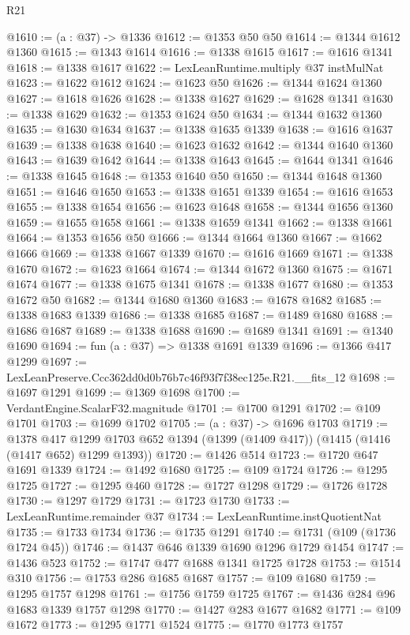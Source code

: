 \begin{lexlean}{R21}
\begin{coremodule}
@1610 := (a : @37) -> @1336
@1612 := @1353 @50 @50
@1614 := @1344 @1612 @1360
@1615 := @1343 @1614
@1616 := @1338 @1615
@1617 := @1616 @1341
@1618 := @1338 @1617
@1622 := LexLeanRuntime.multiply @37 instMulNat
@1623 := @1622 @1612
@1624 := @1623 @50
@1626 := @1344 @1624 @1360
@1627 := @1618 @1626
@1628 := @1338 @1627
@1629 := @1628 @1341
@1630 := @1338 @1629
@1632 := @1353 @1624 @50
@1634 := @1344 @1632 @1360
@1635 := @1630 @1634
@1637 := @1338 @1635 @1339
@1638 := @1616 @1637
@1639 := @1338 @1638
@1640 := @1623 @1632
@1642 := @1344 @1640 @1360
@1643 := @1639 @1642
@1644 := @1338 @1643
@1645 := @1644 @1341
@1646 := @1338 @1645
@1648 := @1353 @1640 @50
@1650 := @1344 @1648 @1360
@1651 := @1646 @1650
@1653 := @1338 @1651 @1339
@1654 := @1616 @1653
@1655 := @1338 @1654
@1656 := @1623 @1648
@1658 := @1344 @1656 @1360
@1659 := @1655 @1658
@1661 := @1338 @1659 @1341
@1662 := @1338 @1661
@1664 := @1353 @1656 @50
@1666 := @1344 @1664 @1360
@1667 := @1662 @1666
@1669 := @1338 @1667 @1339
@1670 := @1616 @1669
@1671 := @1338 @1670
@1672 := @1623 @1664
@1674 := @1344 @1672 @1360
@1675 := @1671 @1674
@1677 := @1338 @1675 @1341
@1678 := @1338 @1677
@1680 := @1353 @1672 @50
@1682 := @1344 @1680 @1360
@1683 := @1678 @1682
@1685 := @1338 @1683 @1339
@1686 := @1338 @1685
@1687 := @1489 @1680
@1688 := @1686 @1687
@1689 := @1338 @1688
@1690 := @1689 @1341
@1691 := @1340 @1690
@1694 := fun (a : @37) => @1338 @1691 @1339
@1696 := @1366 @417 @1299
@1697 := LexLeanPreserve.Ccc362dd0d0b76b7c46f93f7f38ec125e.R21.__fits_12
@1698 := @1697 @1291
@1699 := @1369 @1698
@1700 := VerdantEngine.ScalarF32.magnitude
@1701 := @1700 @1291
@1702 := @109 @1701
@1703 := @1699 @1702
@1705 := (a : @37) -> @1696 @1703
@1719 := @1378
    @417
    @1299
    @1703
    @652
    @1394
    (@1399 (@1409 @417))
    (@1415 (@1416 (@1417 @652) @1299 @1393))
@1720 := @1426 @514
@1723 := @1720 @647 @1691 @1339
@1724 := @1492 @1680
@1725 := @109 @1724
@1726 := @1295 @1725
@1727 := @1295 @460
@1728 := @1727 @1298
@1729 := @1726 @1728
@1730 := @1297 @1729
@1731 := @1723 @1730
@1733 := LexLeanRuntime.remainder @37
@1734 := LexLeanRuntime.instQuotientNat
@1735 := @1733 @1734
@1736 := @1735 @1291
@1740 := @1731 (@109 (@1736 @1724 @45))
@1746 := @1437 @646 @1339 @1690 @1296 @1729 @1454
@1747 := @1436 @523
@1752 := @1747 @477 @1688 @1341 @1725 @1728
@1753 := @1514 @310
@1756 := @1753 @286 @1685 @1687
@1757 := @109 @1680
@1759 := @1295 @1757 @1298
@1761 := @1756 @1759 @1725
@1767 := @1436 @284 @96 @1683 @1339 @1757 @1298
@1770 := @1427 @283 @1677 @1682
@1771 := @109 @1672
@1773 := @1295 @1771 @1524
@1775 := @1770 @1773 @1757

\end{coremodule}
\end{lexlean}
